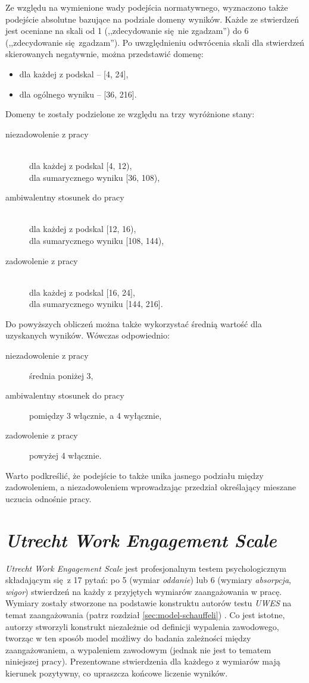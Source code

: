 Ze względu na wymienione wady podejścia normatywnego, wyznaczono także podejście absolutne bazujące na podziale domeny wyników. Każde ze stwierdzeń jest oceniane na skali od 1 (,,zdecydowanie się nie zgadzam'') do 6 (,,zdecydowanie się zgadzam''). Po uwzględnieniu odwrócenia skali dla stwierdzeń skierowanych negatywnie, można przedstawić domenę:
\begin{itemize}
\item dla każdej z podskal -- [4, 24],
\item dla ogólnego wyniku -- [36, 216].
\end{itemize}
Domeny te zostały podzielone ze względu na trzy wyróżnione stany:
\begin{description}
\item[niezadowolenie z pracy] \hfill \\
dla każdej z podskal [4, 12), \hfill \\ dla sumarycznego wyniku [36, 108),
\item[ambiwalentny stosunek do pracy] \hfill \\
dla każdej z podskal [12, 16), \hfill \\ dla sumarycznego wyniku [108, 144),
\item[zadowolenie z pracy] \hfill \\
dla każdej z podskal [16, 24], \hfill \\ dla sumarycznego wyniku [144, 216].
\end{description}

Do powyższych obliczeń można także wykorzystać średnią wartość dla uzyskanych wyników. Wówczas odpowiednio:
\begin{description}
\item[niezadowolenie z pracy] średnia poniżej 3,
\item[ambiwalentny stosunek do pracy] pomiędzy 3 włącznie, a 4 wyłącznie,
\item[zadowolenie z pracy] powyżej 4 włącznie.
\end{description}

Warto podkreślić, że podejście to także unika jasnego podziału między zadowoleniem, a niezadowoleniem wprowadzając przedział określający mieszane uczucia odnośnie pracy.

\section{\emph{Utrecht Work Engagement Scale}}
\label{sec:tests-eng}
\emph{Utrecht Work Engagement Scale} jest profesjonalnym testem psychologicznym składającym się z 17 pytań: po 5 (wymiar \textit{oddanie}) lub 6 (wymiary \textit{absorpcja}, \textit{wigor}) stwierdzeń na każdy z przyjętych wymiarów zaangażowania w pracę. Wymiary zostały stworzone na podstawie konstruktu autorów testu \emph{UWES} na temat zaangażowania (patrz rozdział \ref{sec:model-schauffeli}) \cite{schaufeli2001burnout}. Co jest istotne, autorzy stworzyli konstrukt niezależnie od definicji wypalenia zawodowego, tworząc w ten sposób model możliwy do
badania zależności między zaangażowaniem, a wypaleniem zawodowym (jednak nie jest to tematem niniejszej pracy). Prezentowane stwierdzenia dla każdego z wymiarów mają kierunek pozytywny, co upraszcza końcowe liczenie wyników.

